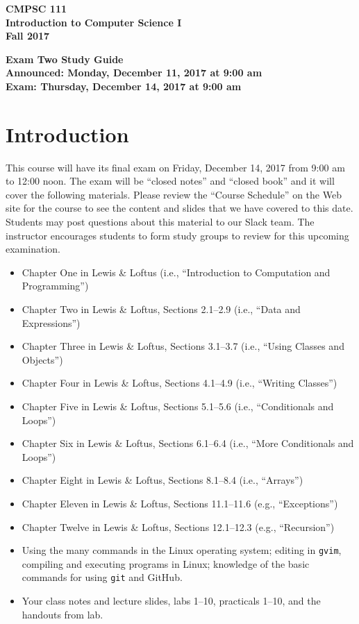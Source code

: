 \documentclass[11pt]{article}
\newcommand{\assignmentduedate}{December 14}
\newcommand{\assignmentassignedate}{December 11}
\newcommand{\assignmentnumber}{Two}
\newcommand{\labyear}{2017}
\newcommand{\assignedday}{Monday}
\newcommand{\dueday}{Thursday}
\newcommand{\labtime}{9:00 am}
\newcommand{\assigneddate}{Announced: \assignedday, \assignmentassignedate, \labyear{} at \labtime{}}
\newcommand{\duedate}{Exam: \dueday, \assignmentduedate, \labyear{} at \labtime{}}
\newcommand{\guidetitle}[1]
{
  \begin{center}
    \begin{center}
      \bf
      CMPSC 111\\Introduction to Computer Science I\\
      Fall 2017\\
      \medskip
    \end{center}
    \bf
    #1
  \end{center}
}
\begin{document}
\guidetitle{Exam \assignmentnumber{} Study Guide \\ \assigneddate{} \\ \duedate{}}

\section*{Introduction}

This course will have its final exam on Friday, \assignmentduedate{}, 2017 from 9:00 am to 12:00 noon. The exam will be
``closed notes'' and ``closed book'' and it will cover the following materials. Please review the ``Course Schedule'' on
the Web site for the course to see the content and slides that we have covered to this date. Students may post questions
about this material to our Slack team. The instructor encourages students to form study groups to review for this
upcoming examination.

  \begin{itemize}

    \itemsep 0in

    \item Chapter One in Lewis \& Loftus (i.e., ``Introduction to Computation and Programming'')

    \item Chapter Two in Lewis \& Loftus, Sections 2.1--2.9 (i.e., ``Data and Expressions'')

    \item Chapter Three in Lewis \& Loftus, Sections 3.1--3.7 (i.e., ``Using Classes and Objects'')

    \item Chapter Four in Lewis \& Loftus, Sections 4.1--4.9 (i.e., ``Writing Classes'')

    \item Chapter Five in Lewis \& Loftus, Sections 5.1--5.6 (i.e., ``Conditionals and Loops'')

    \item Chapter Six in Lewis \& Loftus, Sections 6.1--6.4 (i.e., ``More Conditionals and Loops'')

    \item Chapter Eight in Lewis \& Loftus, Sections 8.1--8.4 (i.e., ``Arrays'')

    \item Chapter Eleven in Lewis \& Loftus, Sections 11.1--11.6 (e.g., ``Exceptions'')

    \item Chapter Twelve in Lewis \& Loftus, Sections 12.1--12.3 (e.g., ``Recursion'')

    \item Using the many commands in the Linux operating system; editing in {\tt gvim}, compiling and executing
      programs in Linux; knowledge of the basic commands for using {\tt git} and GitHub.

    \item Your class notes and lecture slides, labs 1--10, practicals 1--10, and the handouts from lab.

  \end{itemize}
\end{document}
